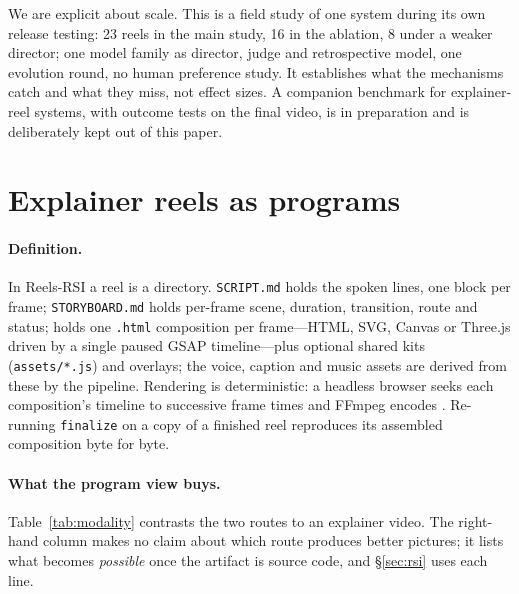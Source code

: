 \documentclass[11pt]{article}
\newcommand{\sys}{Reels-RSI}
\begin{document}
We are explicit about scale. This is a field study of one system during its own release testing:
23 reels in the main study, 16 in the ablation, 8 under a weaker director; one model family as director, judge and retrospective
model, one evolution round, no human preference study. It establishes what the mechanisms catch and
what they miss, not effect sizes. A companion benchmark for explainer-reel systems, with outcome tests
on the final video, is in preparation and is deliberately kept out of this paper.

\section{Explainer reels as programs}
\label{sec:modality}

\paragraph{Definition.} In \sys{} a reel is a directory. \texttt{SCRIPT.md} holds the spoken lines,
one block per frame; \texttt{STORYBOARD.md} holds per-frame scene, duration, transition, route and
status;  holds one \texttt{.html} composition per frame---HTML, SVG,
Canvas or Three.js driven by a single paused GSAP timeline---plus optional shared kits
(\texttt{assets/*.js}) and overlays; the voice, caption and music assets are derived from these by
the pipeline. Rendering is deterministic: a headless browser seeks each composition's timeline to
successive frame times and FFmpeg encodes \citep{hyperframes}. Re-running \texttt{finalize} on a copy
of a finished reel reproduces its assembled composition byte for byte.

\paragraph{What the program view buys.} Table~\ref{tab:modality} contrasts the two routes to an
explainer video. The right-hand column makes no claim about which route produces better pictures;
it lists what becomes \emph{possible} once the artifact is source code, and \S\ref{sec:rsi} uses
each line.
\end{document}
